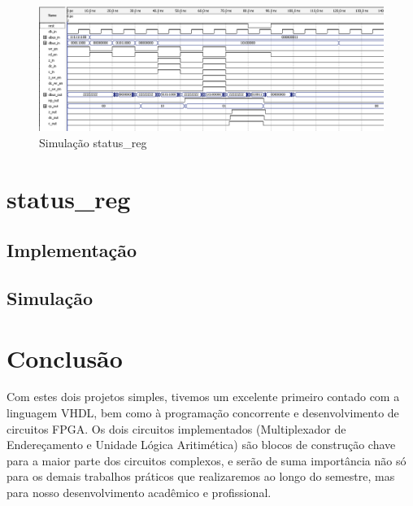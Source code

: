 \documentclass{article}
\begin{document}
\begin{figure}[ht]
    \begin{center}
        \includegraphics[width=15cm]{images/status.png}
        \caption{Simulação status\_reg}
\end{center}
\end{figure}

\section{status\_reg}

\subsection{Implementação}

\subsection{Simulação}

\subsection{}

\newpage

\section{Conclusão}
Com estes dois projetos simples, tivemos um excelente primeiro contado com a linguagem VHDL, bem como à programação concorrente e desenvolvimento de circuitos FPGA. Os dois circuitos implementados (Multiplexador de Endereçamento e Unidade Lógica Aritimética) são blocos de construção chave para a maior parte dos circuitos complexos, e serão de suma importância não só para os demais trabalhos práticos que realizaremos ao longo do semestre, mas para nosso desenvolvimento acadêmico e profissional.
\end{document}
